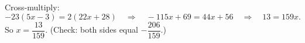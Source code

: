 Cross-multiply:
\[
-23(5x-3)=2(22x+28)\quad\Longrightarrow\quad -115x+69=44x+56\quad\Longrightarrow\quad 13=159x .
\]
So $x=\boxed{\dfrac{13}{159}}$. (Check: both sides equal $-\dfrac{206}{159}$.)
